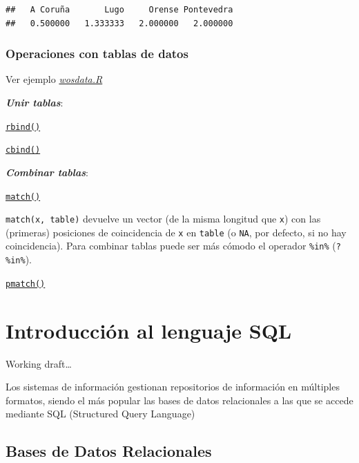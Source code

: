 \documentclass[]{book}
\begin{document}
\begin{verbatim}
##   A Coruña       Lugo     Orense Pontevedra 
##   0.500000   1.333333   2.000000   2.000000
\end{verbatim}

\hypertarget{operaciones-con-tablas-de-datos}{%
\subsection{Operaciones con tablas de datos}\label{operaciones-con-tablas-de-datos}}

Ver ejemplo \href{data/wosdata.zip}{\emph{wosdata.R}}

\textbf{\emph{Unir tablas}}:

\href{https://www.rdocumentation.org/packages/base/versions/3.6.1/topics/rbind}{\texttt{rbind()}}

\href{https://www.rdocumentation.org/packages/base/versions/3.6.1/topics/cbind}{\texttt{cbind()}}

\textbf{\emph{Combinar tablas}}:

\href{https://www.rdocumentation.org/packages/base/versions/3.6.1/topics/match}{\texttt{match()}}

\texttt{match(x,\ table)} devuelve un vector (de la misma longitud que \texttt{x})
con las (primeras) posiciones de coincidencia de \texttt{x} en \texttt{table}
(o \texttt{NA}, por defecto, si no hay coincidencia).
Para combinar tablas puede ser más cómodo el operador \texttt{\%in\%} (\texttt{?\textquotesingle{}\%in\%\textquotesingle{}}).

\href{https://www.rdocumentation.org/packages/base/versions/3.6.1/topics/match}{\texttt{pmatch()}}

\hypertarget{introduccion-al-lenguaje-sql}{%
\chapter{Introducción al lenguaje SQL}\label{introduccion-al-lenguaje-sql}}

Working draft\ldots{}

Los sistemas de información gestionan repositorios de información en múltiples formatos,
siendo el más popular las bases de datos relacionales a las que se accede mediante SQL (Structured Query Language)

\hypertarget{bases-de-datos-relacionales}{%
\section{Bases de Datos Relacionales}\label{bases-de-datos-relacionales}}
\end{document}
